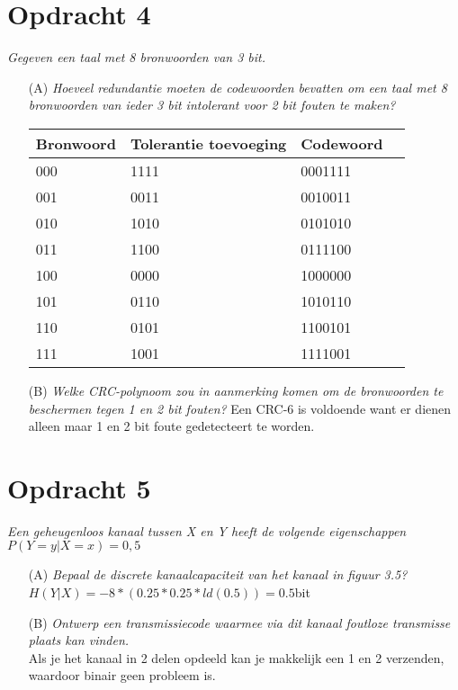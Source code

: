 \section{Opdracht 4}
\emph{Gegeven een taal met 8 bronwoorden van 3 bit.}

\begin{itemize}
\item[(A)] \emph{Hoeveel redundantie moeten de codewoorden bevatten om een taal met 8 bronwoorden van ieder 3 bit intolerant voor 2 bit fouten te maken?}

\begin{tabular}{|l|l|l|l|}
  \hline
  Bronwoord & Tolerantie toevoeging & Codewoord \\ \hline
  000 & 1111 & 0001111 \\ \hline
  001 & 0011 & 0010011 \\ \hline
  010 & 1010 & 0101010 \\ \hline
  011 & 1100 & 0111100 \\ \hline
  100 & 0000 & 1000000 \\ \hline
  101 & 0110 & 1010110 \\ \hline
  110 & 0101 & 1100101 \\ \hline
  111 & 1001 & 1111001 \\ \hline
\end{tabular}

\item[(B)] \emph{Welke CRC-polynoom zou in aanmerking komen om de bronwoorden te beschermen tegen 1 en 2 bit fouten?}
Een CRC-6 is voldoende want er dienen alleen maar 1 en 2 bit foute gedetecteert te worden.
\end{itemize}

\section{Opdracht 5}
\emph{Een geheugenloos kanaal tussen \emph{X} en \emph{Y} heeft de volgende eigenschappen $P(Y=y|X=x)=0,5$}
\begin{itemize}
  \item[(A)] \emph{Bepaal de discrete kanaalcapaciteit van het kanaal in figuur 3.5?} \\ $H(Y|X)=-8*(0.25*0.25*ld(0.5))=0.5$bit
  \item[(B)] \emph{Ontwerp een transmissiecode waarmee via dit kanaal foutloze transmisse plaats kan vinden.} \\ Als je het kanaal in 2 delen opdeeld kan je makkelijk een 1 en 2 verzenden, waardoor binair geen probleem is.
\end{itemize}
